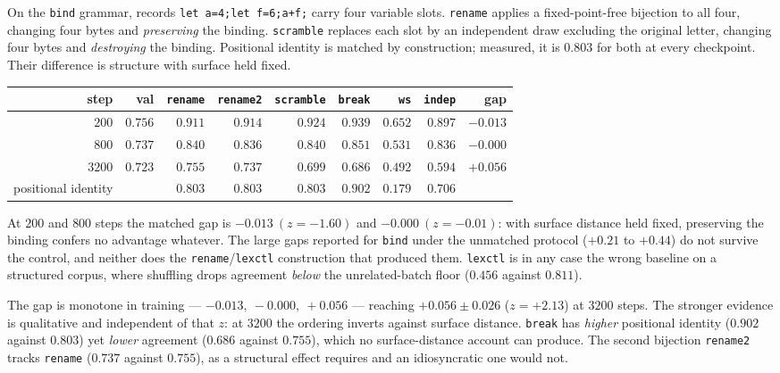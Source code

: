 On the \texttt{bind} grammar, records \texttt{let a=4;let f=6;a+f;} carry four
variable slots. \texttt{rename} applies a fixed-point-free bijection to all
four, changing four bytes and \emph{preserving} the binding.
\texttt{scramble} replaces each slot by an independent draw excluding the
original letter, changing four bytes and \emph{destroying} the binding.
Positional identity is matched by construction; measured, it is $0.803$ for
both at every checkpoint. Their difference is structure with surface held
fixed.

\begin{center}
\begin{tabular}{rrrrrrrrr}
\hline
step & val & \texttt{rename} & \texttt{rename2} & \texttt{scramble} & \texttt{break} & \texttt{ws} & \texttt{indep} & gap \\
\hline
$200$  & $0.756$ & $0.911$ & $0.914$ & $0.924$ & $0.939$ & $0.652$ & $0.897$ & $-0.013$ \\
$800$  & $0.737$ & $0.840$ & $0.836$ & $0.840$ & $0.851$ & $0.531$ & $0.836$ & $-0.000$ \\
$3200$ & $0.723$ & $0.755$ & $0.737$ & $0.699$ & $0.686$ & $0.492$ & $0.594$ & $+0.056$ \\
\hline
positional identity & & $0.803$ & $0.803$ & $0.803$ & $0.902$ & $0.179$ & $0.706$ & \\
\hline
\end{tabular}
\end{center}

\begin{observation}
\label{obs:gap-retracted}
At $200$ and $800$ steps the matched gap is $-0.013\ (z=-1.60)$ and
$-0.000\ (z=-0.01)$: with surface distance held fixed, preserving the binding
confers no advantage whatever. The large gaps reported for \texttt{bind} under
the unmatched protocol ($+0.21$ to $+0.44$) do not survive the control, and
neither does the \texttt{rename}/\texttt{lexctl} construction that produced
them. \texttt{lexctl} is in any case the wrong baseline on a structured
corpus, where shuffling drops agreement \emph{below} the unrelated-batch floor
($0.456$ against $0.811$).
\end{observation}

\begin{observation}
\label{obs:stabilizer-signal}
The gap is monotone in training --- $-0.013,\ -0.000,\ +0.056$ --- reaching
$+0.056\pm0.026$ ($z=+2.13$) at $3200$ steps. The stronger evidence is
qualitative and independent of that $z$: at $3200$ the ordering inverts against
surface distance. \texttt{break} has \emph{higher} positional identity
($0.902$ against $0.803$) yet \emph{lower} agreement ($0.686$ against
$0.755$), which no surface-distance account can produce. The second bijection
\texttt{rename2} tracks \texttt{rename} ($0.737$ against $0.755$), as a
structural effect requires and an idiosyncratic one would not.
\end{observation}

